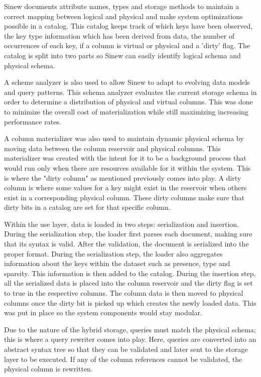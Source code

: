 \documentclass[sigconf]{acmart}
\begin{document}
   Sinew documents attribute names, types and storage methods to maintain a correct mapping between logical and physical and make system optimizations possible in a catalog. This catalog keeps track of which keys have been observed, the key type information which has been derived from data, the number of occurrences of each key, if a column is virtual or physical and a 'dirty' flag. The catalog is split into two parts so Sinew can easily identify logical schema and physical schema.

   A scheme analyzer is also used to allow Sinew to adapt to evolving data models and query patterns. This schema analyzer evaluates the current storage schema in order to determine a distribution of physical and virtual columns. This was done to minimize the overall cost of materialization while still maximizing increasing performance rates.

   A column materializer was also used to maintain dynamic physical schema by moving data between the column reservoir and physical columns. This materializer was created with the intent for it to be a background process that would run only when there are resources available for it within the system. This is where the "dirty column" as mentioned previously comes into play. A dirty column is where some values for a key might exist in the reservoir when others exist in a corresponding physical column. These dirty columns make sure that dirty bits in a catalog are set for that specific column.

   Within the use layer, data is loaded in two steps: serialization and insertion. During the serialization step, the loader first parses each document, making sure that its syntax is valid. After the validation, the document is serialized into the proper format. During the serialization step, the loader also aggregates information about the keys within the dataset such as presence, type and sparsity. This information is then added to the catalog. During the insertion step, all the serialized data is placed into the column reservoir and the dirty flag is set to true in the respective columns. The column data is then moved to physical columns once the dirty bit is picked up which creates the newly loaded data. This was put in place so the system components would stay modular.

   Due to the nature of the hybrid storage, queries must match the physical schema; this is where a query rewriter comes into play. Here, queries are converted into an abstract syntax tree so that they can be validated and later sent to the storage layer to be executed. If any of the column references cannot be validated, the physical column is rewritten.
\end{document}
